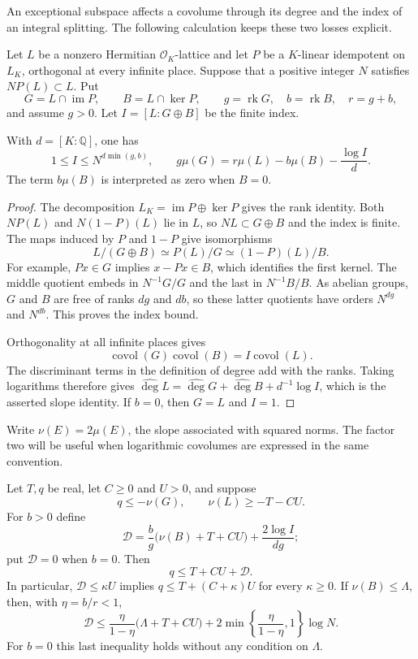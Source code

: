 An exceptional subspace affects a covolume through its degree and the
index of an integral splitting. The following calculation keeps these
two losses explicit.

Let $L$ be a nonzero Hermitian $\mathcal O_K$-lattice and let $P$ be a
$K$-linear idempotent on $L_K$, orthogonal at every infinite place.
Suppose that a positive integer $N$ satisfies $NP(L)\subset L$. Put
\[
 G=L\cap\operatorname{im}P,\qquad B=L\cap\ker P,\qquad
 g=\operatorname{rk}G,\quad b=\operatorname{rk}B,\quad r=g+b,
\]
and assume $g>0$. Let $I=[L:G\oplus B]$ be the finite index.

\begin{proposition}
\label{cs-orthogonal-cut}
With $d=[K:\mathbb Q]$, one has
\[
 1\le I\le N^{d\min(g,b)},\qquad
 g\mu(G)=r\mu(L)-b\mu(B)-\frac{\log I}{d}.
\]
The term $b\mu(B)$ is interpreted as zero when $B=0$.
\end{proposition}

\begin{proof}
The decomposition $L_K=\operatorname{im}P\oplus\ker P$ gives the rank
identity. Both $NP(L)$ and $N(1-P)(L)$ lie in $L$, so
$NL\subset G\oplus B$ and the index is finite.
The maps induced by $P$ and $1-P$ give isomorphisms
\[
 L/(G\oplus B)\simeq P(L)/G
                  \simeq (1-P)(L)/B.
\]
For example, $Px\in G$ implies $x-Px\in B$, which identifies the first
kernel. The middle quotient embeds in $N^{-1}G/G$ and the last in
$N^{-1}B/B$. As abelian groups, $G$ and $B$ are free of ranks $dg$
and $db$, so these latter quotients have orders $N^{dg}$ and $N^{db}$.
This proves the index bound.

Orthogonality at all infinite places gives
\[
 \operatorname{covol}(G)\operatorname{covol}(B)
       =I\operatorname{covol}(L).
\]
The discriminant terms in the definition of degree add with the ranks.
Taking logarithms therefore gives
$\widehat{\deg}L=\widehat{\deg}G+\widehat{\deg}B+d^{-1}\log I$,
which is the asserted slope identity. If $b=0$, then $G=L$ and $I=1$.
\end{proof}

Write $\nu(E)=2\mu(E)$, the slope associated with squared norms.
The factor two will be useful when logarithmic covolumes are expressed
in the same convention.

\begin{corollary}
\label{cs-exceptional-budget}
Let $T,q$ be real, let $C\ge0$ and $U>0$, and suppose
\[
 q\le-\nu(G),\qquad \nu(L)\ge-T-CU.
\]
For $b>0$ define
\[
 \mathcal D=
 \frac bg\bigl(\nu(B)+T+CU\bigr)+\frac{2\log I}{dg};
\]
put $\mathcal D=0$ when $b=0$. Then
\[
 q\le T+CU+\mathcal D.
\]
In particular, $\mathcal D\le\kappa U$ implies
$q\le T+(C+\kappa)U$ for every $\kappa\ge0$.
If $\nu(B)\le\Lambda$, then, with $\eta=b/r<1$,
\[
 \mathcal D\le
 \frac{\eta}{1-\eta}\bigl(\Lambda+T+CU\bigr)
 +2\min\!\left\{\frac{\eta}{1-\eta},1\right\}\log N.
\]
For $b=0$ this last inequality holds without any condition on $\Lambda$.
\end{corollary}

